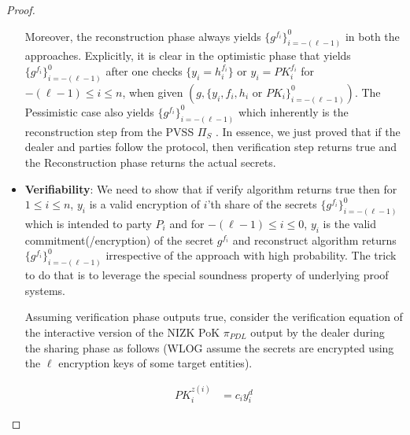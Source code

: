 \begin{proof}
\begin{itemize}
    Moreover, the reconstruction phase always yields $\{g^{f_i}\}_{i=-(\ell-1)}^0$ in both the approaches. Explicitly, it is 
    clear in the optimistic phase that yields $\{g^{f_i}\}_{i=-(\ell-1)}^0$ after one checks $\{y_i=h_i^{f_i}\}$ or $y_i=PK_i^{f_i}$ for $-(\ell-1)\leq i\leq n$,  
    when given $(g,\{y_i,f_i,h_i\text{ or }PK_i\}_{i=-(\ell-1)}^0)$. The Pessimistic case also yields 
    $\{g^{f_i}\}_{i=-(\ell-1)}^0$ which inherently is the reconstruction step from the PVSS $\Pi_S$ \cite{cryptoeprint:2023/1669}. 
    In essence, we just proved that if the dealer and parties follow the protocol, then verification step returns 
    true and the Reconstruction phase returns the actual secrets.

    \item \textbf{Verifiability}: We need to show that if verify algorithm returns true then for $1\leq i\leq n$, 
    $y_i$ is a valid encryption of $i$'th share of the secrets $\{g^{f_i}\}_{i=-(\ell-1)}^0$ which is intended to party $P_i$ and 
    for $-(\ell-1)\leq i\leq 0$, $y_i$ is the valid commitment(/encryption) of the secret $g^{f_i}$ and 
    reconstruct algorithm returns $\{g^{f_i}\}_{i=-(\ell-1)}^0$ irrespective of the approach with high probability. The 
    trick to do that is to leverage the special soundness property of underlying proof systems.\par

    Assuming verification phase outputs true, consider the verification equation of the interactive version of the NIZK PoK $\pi_{PDL}$ output by the dealer 
    during the sharing phase as follows (WLOG assume the secrets are encrypted using the $\ell$ encryption keys of some target entities).

    \begin{align*}
      PK_i^{z(i)}&=c_iy_i^d
    \end{align*}

  \end{itemize}
\end{proof}

